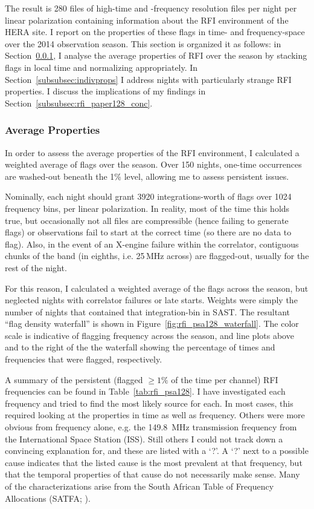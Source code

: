 The result is 280 files of high-time and -frequency resolution files per night per linear polarization containing information about the RFI environment of the HERA site. I report on the properties of these flags in time- and frequency-space over the 2014 observation season. This section is organized it as follows: in Section~\ref{subsubsec:avgprops}, I analyse the average properties of RFI over the season by stacking flags in local time and normalizing appropriately. In Section~\ref{subsubsec:indivprops} I address nights with particularly strange RFI properties. I discuss the implications of my findings in Section~\ref{subsubsec:rfi_paper128_conc}.

\subsubsection{Average Properties}
\label{subsubsec:avgprops}

In order to assess the average properties of the RFI environment, I calculated a weighted average of flags over the season. Over 150 nights, one-time occurrences are washed-out beneath the 1\% level, allowing me to assess persistent issues.

Nominally, each night should grant 3920 integrations-worth of flags over 1024 frequency bins, per linear polarization. In reality, most of the time this holds true, but occasionally not all files are compressible (hence failing to generate flags) or observations fail to start at the correct time (so there are no data to flag). Also, in the event of an X-engine failure within the correlator, contiguous chunks of the band (in eighths, i.e. 25\,MHz across) are flagged-out, usually for the rest of the night.

For this reason, I calculated a weighted average of the flags across the season, but neglected nights with correlator failures or late starts. Weights were simply the number of nights that contained that integration-bin in SAST. The resultant ``flag density waterfall'' is shown in Figure~\ref{fig:rfi_psa128_waterfall}. The color scale is indicative of flagging frequency across the season, and line plots above and to the right of the the waterfall showing the percentage of times and frequencies that were flagged, respectively. 

A summary of the persistent (flagged $\geq1\%$ of the time per channel) RFI frequencies can be found in Table~\ref{tab:rfi_psa128}. I have investigated each frequency and tried to find the most likely source for each. In most cases, this required looking at the properties in time as well as frequency. Others were more obvious from frequency alone, e.g. the 149.8\, MHz transmission frequency from the International Space Station (ISS). Still others I could not track down a convincing explanation for, and these are listed with a `?'. A `?' next to a possible cause indicates that the listed cause is the most prevalent at that frequency, but that the temporal properties of that cause do not necessarily make sense. Many of the characterizations arise from the South African Table of Frequency Allocations (SATFA; \cite{SAFreqTable}).


